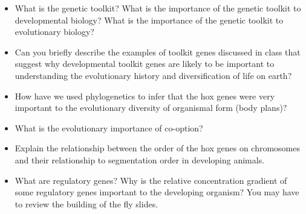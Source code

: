 \documentclass[letterpaper]{tufte-handout}
\begin{document}
\begin{itemize}
	\item What is the genetic toolkit?  What is the importance of the genetic toolkit to developmental biology?  What is the importance of the genetic toolkit to evolutionary biology?  

	\item Can you briefly describe the examples of toolkit genes discussed in class that suggest why developmental toolkit genes are likely to be important to understanding the evolutionary history and diversification of life on earth?

	\item How have we used phylogenetics to infer that the hox genes were very important to the evolutionary diversity of organismal form (body plans)?

	\item What is the evolutionary importance of co-option?

	\item Explain the relationship between the order of the hox genes on chromosomes and their relationship to segmentation order in developing animals.

	\item What are regulatory genes?  Why is the relative concentration gradient of some regulatory genes important to the developing organism?  You may have to review the building of the fly slides.

\end{itemize}
\end{document}
